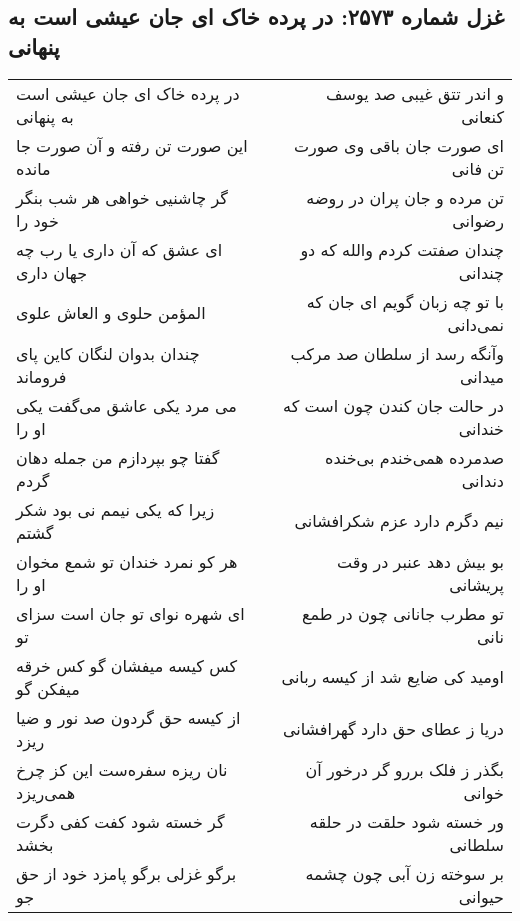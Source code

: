 \begin{center}
\section*{غزل شماره ۲۵۷۳: در پرده خاک ای جان عیشی است به پنهانی}
\label{sec:2573}
\begin{longtable}{l p{0.5cm} r}
در پرده خاک ای جان عیشی است به پنهانی
&&
و اندر تتق غیبی صد یوسف کنعانی
\\
این صورت تن رفته و آن صورت جا مانده
&&
ای صورت جان باقی وی صورت تن فانی
\\
گر چاشنیی خواهی هر شب بنگر خود را
&&
تن مرده و جان پران در روضه رضوانی
\\
ای عشق که آن داری یا رب چه جهان داری
&&
چندان صفتت کردم والله که دو چندانی
\\
المؤمن حلوی و العاش علوی
&&
با تو چه زبان گویم ای جان که نمی‌دانی
\\
چندان بدوان لنگان کاین پای فروماند
&&
وآنگه رسد از سلطان صد مرکب میدانی
\\
می مرد یکی عاشق می‌گفت یکی او را
&&
در حالت جان کندن چون است که خندانی
\\
گفتا چو بپردازم من جمله دهان گردم
&&
صدمرده همی‌خندم بی‌خنده دندانی
\\
زیرا که یکی نیمم نی بود شکر گشتم
&&
نیم دگرم دارد عزم شکرافشانی
\\
هر کو نمرد خندان تو شمع مخوان او را
&&
بو بیش دهد عنبر در وقت پریشانی
\\
ای شهره نوای تو جان است سزای تو
&&
تو مطرب جانانی چون در طمع نانی
\\
کس کیسه میفشان گو کس خرقه میفکن گو
&&
اومید کی ضایع شد از کیسه ربانی
\\
از کیسه حق گردون صد نور و ضیا ریزد
&&
دریا ز عطای حق دارد گهرافشانی
\\
نان ریزه سفره‌ست این کز چرخ همی‌ریزد
&&
بگذر ز فلک بررو گر درخور آن خوانی
\\
گر خسته شود کفت کفی دگرت بخشد
&&
ور خسته شود حلقت در حلقه سلطانی
\\
برگو غزلی برگو پامزد خود از حق جو
&&
بر سوخته زن آبی چون چشمه حیوانی
\\
\end{longtable}
\end{center}

